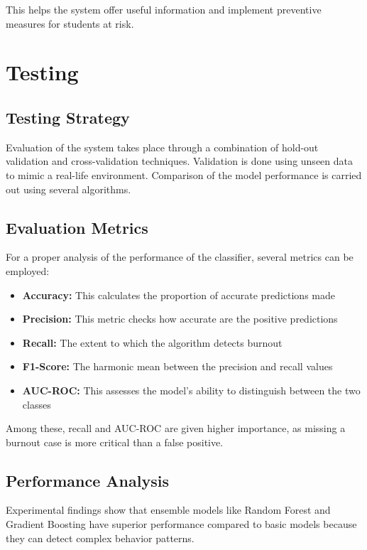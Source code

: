 This helps the system offer useful information and implement preventive measures for students at risk.
\section{Testing}

\subsection{Testing Strategy}

Evaluation of the system takes place through a combination of hold-out validation and cross-validation techniques.
Validation is done using unseen data to mimic a real-life environment. Comparison of the model performance is carried out using several algorithms.

\subsection{Evaluation Metrics}

For a proper analysis of the performance of the classifier, several metrics can be employed:

\begin{itemize}
    \item \textbf{Accuracy:} This calculates the proportion of accurate predictions made
    \item \textbf{Precision:} This metric checks how accurate are the positive predictions
    \item \textbf{Recall:} The extent to which the algorithm detects burnout
    \item \textbf{F1-Score:} The harmonic mean between the precision and recall values
    \item \textbf{AUC-ROC:} This assesses the model’s ability to distinguish between the two classes
\end{itemize}

Among these, recall and AUC-ROC are given higher importance, as missing a burnout case is more critical than a false positive.

\subsection{Performance Analysis}

Experimental findings show that ensemble models like Random Forest and Gradient Boosting have superior performance compared to basic models because they can detect complex behavior patterns.

